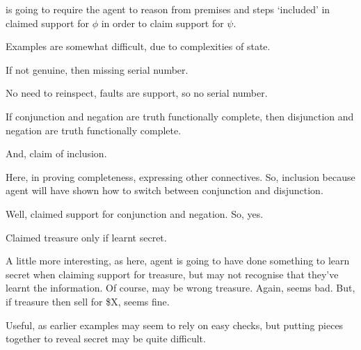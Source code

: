 \begin{note}
  \ESU{} is going to require the agent to reason from premises and steps `included' in claimed support for \(\phi\) in order to claim support for \(\psi\).
\end{note}


\begin{note}[Examples]
  Examples are somewhat difficult, due to complexities of state.
\end{note}

\begin{note}
  \begin{illustration}
    If not genuine, then missing serial number.
  \end{illustration}
  No need to reinspect, faults are support, so no serial number.
\end{note}

\begin{note}
  \begin{illustration}
    If conjunction and negation are truth functionally complete, then disjunction and negation are truth functionally complete.

    And, claim of inclusion.
  \end{illustration}

  Here, in proving completeness, expressing other connectives.
  So, inclusion because agent will have shown how to switch between conjunction and disjunction.

  Well, claimed support for conjunction and negation.
  So, yes.
\end{note}

\begin{note}[Treasure]
  \begin{illustration}
    Claimed treasure only if learnt secret.
  \end{illustration}
  A little more interesting, as here, agent is going to have done something to learn secret when claiming support for treasure, but may not recognise that they've learnt the information.
  Of course, may be wrong treasure.
  Again, seems bad.
  But, if treasure then sell for \$X, seems fine.

  Useful, as earlier examples may seem to rely on easy checks, but putting pieces together to reveal secret may be quite difficult.
\end{note}


